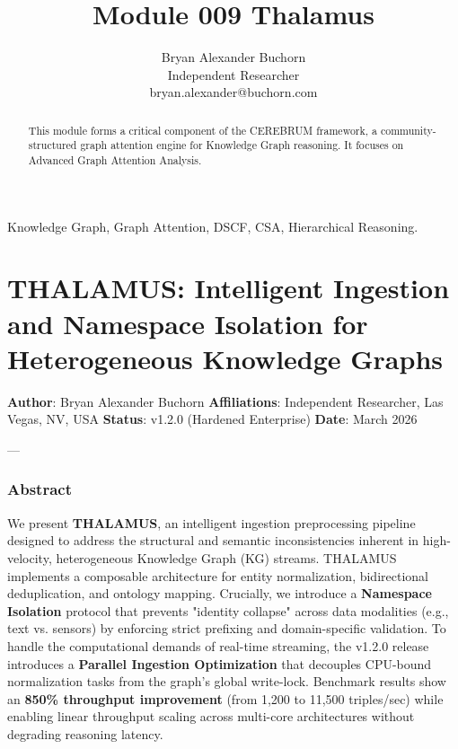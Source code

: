 \documentclass[10pt,journal,compsoc]{IEEEtran}
\begin{document}
\title{Module 009 Thalamus}
\author{Bryan Alexander Buchorn \\ Independent Researcher \\ bryan.alexander@buchorn.com}

\maketitle

\begin{abstract}
This module forms a critical component of the CEREBRUM framework, a community-structured graph attention engine for Knowledge Graph reasoning. It focuses on Advanced Graph Attention Analysis.
\end{abstract}

\begin{IEEEkeywords}
Knowledge Graph, Graph Attention, DSCF, CSA, Hierarchical Reasoning.
\end{IEEEkeywords}

\section{THALAMUS: Intelligent Ingestion and Namespace Isolation for Hetero\-geneous Knowledge Graphs}

\textbf{Author}: Bryan Alexander Buchorn  
\textbf{Affili\-ations}: Independent Researcher, Las Vegas, NV, USA  
\textbf{Status}: v1.2.0 (Hardened Enterprise)  
\textbf{Date}: March 2026

---

\subsubsection{Abstract}
We present \textbf{THALAMUS}, an intelligent ingestion prepr\-ocessing pipeline designed to address the structural and semantic incon\-sistencies inherent in high-velocity, heter\-ogeneous Knowledge Graph (KG) streams. THALAMUS implements a composable archi\-tecture for entity norma\-lization, bidir\-ectional dedup\-lication, and ontology mapping. Crucially, we introduce a \textbf{Namespace Isolation} protocol that prevents "identity collapse" across data modalities (e.g., text vs. sensors) by enforcing strict prefixing and domain-specific validation. To handle the compu\-tational demands of real-time streaming, the v1.2.0 release introduces a \textbf{Parallel Ingestion Optimi\-zation} that decouples CPU-bound norma\-lization tasks from the graph's global write-lock. Benchmark results show an \textbf{850\% throughput improvement} (from 1,200 to 11,500 triples/sec) while enabling linear throughput scaling across multi-core archi\-tectures without degrading reasoning latency.
\end{document}
